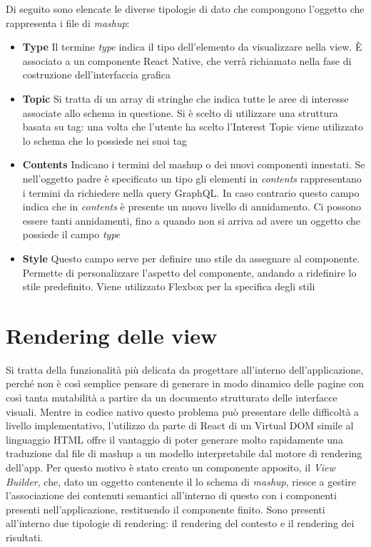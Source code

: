 Di seguito sono elencate le diverse tipologie di dato che compongono l'oggetto che rappresenta i file di \emph{mashup}:

\begin{itemize}
	\item \textbf{Type}
	Il termine \emph{type} indica il tipo dell'elemento da visualizzare nella view. È associato a un componente React Native, che verrà richiamato nella fase di costruzione dell'interfaccia grafica
	\item \textbf{Topic}
	Si tratta di un array di stringhe che indica tutte le aree di interesse associate allo schema in questione. Si è scelto di utilizzare una struttura basata su tag: una volta che l’utente ha scelto l’Interest Topic viene utilizzato lo schema che lo possiede nei suoi tag 
	\item \textbf{Contents}
	Indicano i termini del mashup o dei nuovi componenti innestati. Se nell'oggetto padre è specificato un tipo gli elementi in \emph{contents} rappresentano i termini da richiedere nella query GraphQL. In caso contrario questo campo indica che in \emph{contents} è presente un nuovo livello di annidamento. Ci possono essere tanti annidamenti, fino a quando non si arriva ad avere un oggetto che possiede il campo \emph{type}
	\item \textbf{Style}
	Questo campo serve per definire uno stile da assegnare al componente. Permette di personalizzare l’aspetto del componente, andando a ridefinire lo stile predefinito. Viene utilizzato Flexbox per la specifica degli stili
\end{itemize}

\section{Rendering delle view}\label{sec:rendering-view}

Si tratta della funzionalità più delicata da progettare all'interno dell'applicazione, perché non è così semplice pensare di generare in modo dinamico delle pagine con così tanta mutabilità a partire da un documento strutturato delle interfacce visuali.
Mentre in codice nativo questo problema può presentare delle difficoltà a livello implementativo, l'utilizzo da parte di React di un Virtual DOM simile al linguaggio HTML offre il vantaggio di poter generare molto rapidamente una traduzione dal file di mashup a un modello interpretabile dal motore di rendering dell'app.
Per questo motivo è stato creato un componente apposito, il \emph{View Builder}, che, dato un oggetto contenente il lo schema di \emph{mashup}, riesce a gestire l'associazione dei contenuti semantici all'interno di questo con i componenti presenti nell'applicazione, restituendo il componente finito.
Sono presenti all'interno due tipologie di rendering: il rendering del contesto e il rendering dei risultati.

